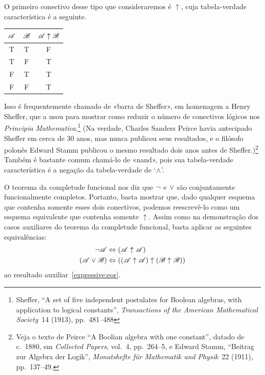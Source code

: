 O primeiro conectivo desse tipo que consideraremos é $\uparrow$, cuja tabela-verdade característica é a seguinte.
\begin{center}
\begin{tabular}{c c | c}
$\mathscr{A}$ & $\mathscr{B}$ & $\mathscr{A} \mathrel{\uparrow} \mathscr{B}$\\
\hline
 T & T & F \\
 T & F & T \\
 F & T & T  \\
 F & F & T
\end{tabular}
\end{center}
Isso é frequentemente chamado de «barra de Sheffer», em homenagem a Henry Sheffer, que a usou para mostrar como reduzir o número de conectivos lógicos nos \textit{Principia Mathematica}.\footnote{Sheffer, ``A set of five independent postulates for Boolean algebras, with application to logical constants'', \textit{Transactions of the American Mathematical Society}~14 (1913), pp.~481--488} (Na verdade, Charles Sanders Peirce havia antecipado Sheffer em cerca de 30 anos, mas nunca publicou seus resultados, e o filósofo polonês Edward Stamm publicou o mesmo resultado dois anos antes de Sheffer.)\footnote{Veja o texto de Peirce ``A Boolian algebra with one constant'', datado de c.~1880, em \textit{Collected Papers}, vol.~4, pp.~264--5, e Edward Stamm, ``\foreignlanguage{german}{Beitrag zur Algebra der Logik}'', \foreignlanguage{german}{\textit{Monatshefte für Mathematik und Physik}}~22 (1911), pp.~137--49.} Também é bastante comum chamá-lo de «nand», pois sua tabela-verdade característica é a negação da tabela-verdade de `$\wedge$'.

















O teorema da completude funcional nos diz que $\neg$ e $\vee$ são conjuntamente funcionalmente completos. Portanto, basta mostrar que, dado qualquer esquema que contenha somente esses dois conectivos, podemos reescrevê-lo como um esquema equivalente que contenha somente $\uparrow$. Assim como na demonstração dos casos auxiliares do teorema da completude funcional, basta aplicar as seguintes equivalências:
		\begin{align*}
			\neg \mathscr{A} &\Leftrightarrow (\mathscr{A} \uparrow \mathscr{A})\\
			(\mathscr{A} \vee \mathscr{B}) & \Leftrightarrow ((\mathscr{A} \uparrow \mathscr{A}) \uparrow (\mathscr{B} \uparrow \mathscr{B}))
		\end{align*}
ao resultado auxiliar~\ref*{expressive:eor}.

